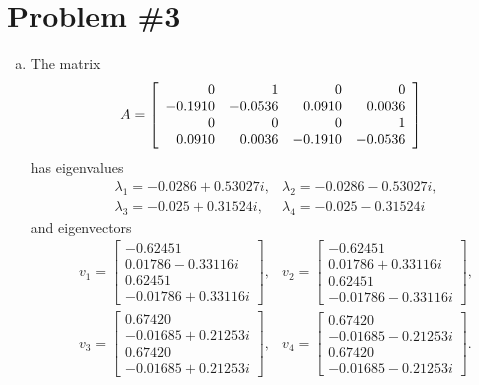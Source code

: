 \documentclass{article}
\begin{document}
\pagebreak

\section*{Problem \#3}

\begin{enumerate}[(a)]
\item{
The matrix
$$
A 
= \left[\begin{array}{r r r r}
    0       &       1 & 0       & 0      \\
    -0.1910 & -0.0536 & 0.0910  & 0.0036 \\
    0       & 0       & 0       & 1      \\
    0.0910  & 0.0036  & -0.1910 & -0.0536
  \end{array}\right]
$$
has eigenvalues
\begin{align*}
& \lambda_1 = -0.0286 + 0.53027i,
& \lambda_2 = -0.0286 - 0.53027i, \\
& \lambda_3 = -0.025  + 0.31524i,
& \lambda_4 = -0.025  - 0.31524i
\end{align*}
and eigenvectors
\begin{align*}
& v_1 
= \left[\begin{array}{c}
    -0.62451 \\
     0.01786 - 0.33116i \\
     0.62451 \\
    -0.01786 + 0.33116i
  \end{array}\right],
& v_2
= \left[\begin{array}{c}
    -0.62451 \\
     0.01786 + 0.33116i \\
     0.62451 \\
    -0.01786 - 0.33116i
  \end{array}\right], \\
& v_3 
= \left[\begin{array}{c}
    0.67420 \\
    -0.01685 + 0.21253i \\
    0.67420 \\
    -0.01685 + 0.21253i
  \end{array}\right],
& v_4 
= \left[\begin{array}{c}
    0.67420 \\
    -0.01685 - 0.21253i \\
    0.67420 \\
    -0.01685 - 0.21253i
  \end{array}\right].
\end{align*}
}
\end{enumerate}
\end{document}
